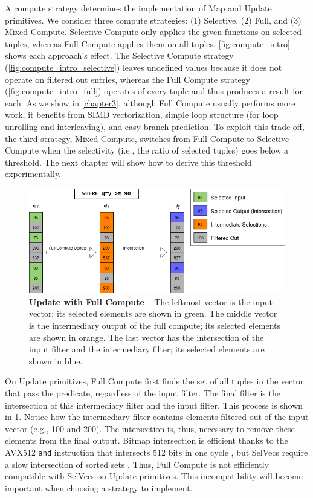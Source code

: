 \documentclass[12pt]{cmuthesis}
\begin{document}
A compute strategy determines the implementation of Map and Update primitives. We consider three compute strategies: (1) Selective, (2) Full, and (3) Mixed Compute. Selective Compute only applies the given functions on selected tuples, whereas Full Compute applies them on all tuples. \cref{fig:compute_intro} shows each approach's effect. The Selective Compute strategy (\cref{fig:compute_intro_selective}) leaves undefined values because it does not operate on filtered out entries, whereas the Full Compute strategy (\cref{fig:compute_intro_full}) operates of every tuple and thus produces a result for each. As we show in \cref{chapter3}, although Full Compute usually performs more work, it benefits from SIMD vectorization, simple loop structure (for loop unrolling and interleaving), and easy branch prediction. To exploit this trade-off, the third strategy, Mixed Compute, switches from Full Compute to Selective Compute when the selectivity (i.e., the ratio of selected tuples) goes below a threshold. The next chapter will show how to derive this threshold experimentally.

\begin{figure}[t!]
    \centering
    \includegraphics[scale=0.5]{images/FullComputeUpdate.png}
    \caption{\textbf{Update with Full Compute} -- The leftmost vector is the input vector; its selected elements are shown in green. The middle vector is the intermediary output of the full compute; its selected elements are shown in orange. The last vector has the intersection of the input filter and the intermediary filter; its selected elements are shown in blue.}
    \label{fig:full_compute_update}
\end{figure}


On Update primitives, Full Compute first finds the set of all tuples in the vector that pass the predicate, regardless of the input filter. The final filter is the intersection of this intermediary filter and the input filter. This process is shown in \cref{fig:full_compute_update}. Notice how the intermediary filter contains elements filtered out of the input vector (e.g., 100 and 200). The intersection is, thus, necessary to remove these elements from the final output. Bitmap intersection is efficient thanks to the AVX512 \texttt{and} instruction that intersects 512 bits in one cycle \cite{intel2019}, but SelVecs require a slow intersection of sorted sets \cite{sorted_set}. Thus, Full Compute is not efficiently compatible with SelVecs on Update primitives. This incompatibility will become important when choosing a strategy to implement.
\end{document}
